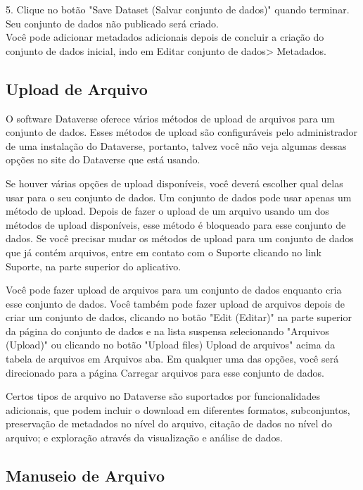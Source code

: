 \documentclass[12pt,hidelinks]{article}
\begin{document}
5. Clique no botão "Save Dataset (Salvar conjunto de dados)" quando terminar. Seu conjunto de dados não publicado será criado.\\

Você pode adicionar metadados adicionais depois de concluir a criação do conjunto de dados inicial, indo em Editar conjunto de dados> Metadados.

    
    \subsection{Upload de Arquivo}
    
\qquad O software Dataverse oferece vários métodos de upload de arquivos para um conjunto de dados. Esses métodos de upload são configuráveis pelo administrador de uma instalação do Dataverse, portanto, talvez você não veja algumas dessas opções no site do Dataverse que está usando.

Se houver várias opções de upload disponíveis, você deverá escolher qual delas usar para o seu conjunto de dados. Um conjunto de dados pode usar apenas um método de upload. Depois de fazer o upload de um arquivo usando um dos métodos de upload disponíveis, esse método é bloqueado para esse conjunto de dados. Se você precisar mudar os métodos de upload para um conjunto de dados que já contém arquivos, entre em contato com o Suporte clicando no link Suporte, na parte superior do aplicativo.

Você pode fazer upload de arquivos para um conjunto de dados enquanto cria esse conjunto de dados. Você também pode fazer upload de arquivos depois de criar um conjunto de dados, clicando no botão "Edit (Editar)" na parte superior da página do conjunto de dados e na lista suspensa selecionando "Arquivos (Upload)" ou clicando no botão "Upload files) Upload de arquivos" acima da tabela de arquivos em Arquivos aba. Em qualquer uma das opções, você será direcionado para a página Carregar arquivos para esse conjunto de dados.

Certos tipos de arquivo no Dataverse são suportados por funcionalidades adicionais, que podem incluir o download em diferentes formatos, subconjuntos, preservação de metadados no nível do arquivo, citação de dados no nível do arquivo; e exploração através da visualização e análise de dados.
    
    \subsection{Manuseio de Arquivo}
    
\end{document}
